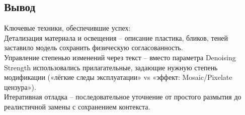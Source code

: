 \subsection{Вывод}
Ключевые техники, обеспечившие успех: \\
Детализация материала и освещения – описание пластика, бликов, теней заставило модель сохранить физическую согласованность. \\
Управление степенью изменений через текст – вместо параметра Denoising Strength использовались прилагательные, задающие нужную степень модификации («лёгкие следы эксплуатации» vs «эффект: Mosaic/Pixelate цензура»). \\
Итеративная отладка – последовательное уточнение от простого размытия до реалистичной замены с сохранением контекста. \\